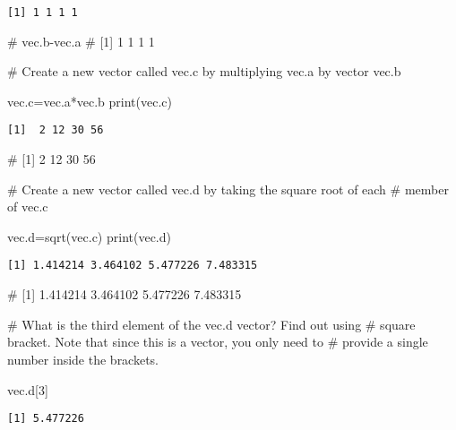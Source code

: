 \documentclass[
  letterpaper,
  DIV=11,
  numbers=noendperiod]{scrartcl}
\newenvironment{Shaded}{\begin{snugshade}}{\end{snugshade}}
\newcommand{\CommentTok}[1]{\textcolor[rgb]{0.37,0.37,0.37}{#1}}
\newcommand{\DecValTok}[1]{\textcolor[rgb]{0.68,0.00,0.00}{#1}}
\newcommand{\FunctionTok}[1]{\textcolor[rgb]{0.28,0.35,0.67}{#1}}
\newcommand{\NormalTok}[1]{\textcolor[rgb]{0.00,0.23,0.31}{#1}}
\newcommand{\OtherTok}[1]{\textcolor[rgb]{0.00,0.23,0.31}{#1}}
\newcommand{\SpecialCharTok}[1]{\textcolor[rgb]{0.37,0.37,0.37}{#1}}
\begin{document}
\begin{verbatim}
[1] 1 1 1 1
\end{verbatim}

\begin{Shaded}
\begin{Highlighting}[]
\CommentTok{\# vec.b{-}vec.a}
\CommentTok{\# [1] 1 1 1 1}

\CommentTok{\# Create a new vector called vec.c by multiplying vec.a by vector vec.b}


\NormalTok{vec.c}\OtherTok{=}\NormalTok{vec.a}\SpecialCharTok{*}\NormalTok{vec.b}
\FunctionTok{print}\NormalTok{(vec.c)}
\end{Highlighting}
\end{Shaded}

\begin{verbatim}
[1]  2 12 30 56
\end{verbatim}

\begin{Shaded}
\begin{Highlighting}[]
\CommentTok{\# [1]  2 12 30 56}

\CommentTok{\# Create a new vector called vec.d by taking the square root of each }
\CommentTok{\# member of vec.c}


\NormalTok{vec.d}\OtherTok{=}\FunctionTok{sqrt}\NormalTok{(vec.c)}
\FunctionTok{print}\NormalTok{(vec.d)}
\end{Highlighting}
\end{Shaded}

\begin{verbatim}
[1] 1.414214 3.464102 5.477226 7.483315
\end{verbatim}

\begin{Shaded}
\begin{Highlighting}[]
\CommentTok{\# [1] 1.414214 3.464102 5.477226 7.483315}

\CommentTok{\# What is the third element of the vec.d vector? Find out using }
\CommentTok{\# square bracket. Note that since this is a vector, you only need to }
\CommentTok{\# provide a single number inside the brackets. }


\NormalTok{vec.d[}\DecValTok{3}\NormalTok{]}
\end{Highlighting}
\end{Shaded}

\begin{verbatim}
[1] 5.477226
\end{verbatim}
\end{document}
